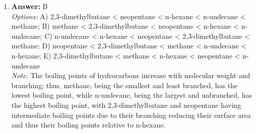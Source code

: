\documentclass[12pt]{article}
\begin{document}
\begin{enumerate}[label=\arabic*.]
\item \textbf{Answer:} B
\\ \textit{Options:} A) 2,3-dimethylbutane \textless{} neopentane \textless{} n-hexane \textless{} n-undecane \textless{} methane; B) methane \textless{} 2,3-dimethylbutane \textless{} neopentane \textless{} n-hexane \textless{} n-undecane; C) n-undecane \textless{} n-hexane \textless{} neopentane \textless{} 2,3-dimethylbutane \textless{} methane; D) neopentane \textless{} 2,3-dimethylbutane \textless{} methane \textless{} n-undecane \textless{} n-hexane; E) 2,3-dimethylbutane \textless{} methane \textless{} n-hexane \textless{} neopentane \textless{} n-undecane
\\ \textit{Note:} The boiling points of hydrocarbons increase with molecular weight and branching; thus, methane, being the smallest and least branched, has the lowest boiling point, while n-undecane, being the largest and unbranched, has the highest boiling point, with 2,3-dimethylbutane and neopentane having intermediate boiling points due to their branching reducing their surface area and thus their boiling points relative to n-hexane.
\end{enumerate}
\end{document}
